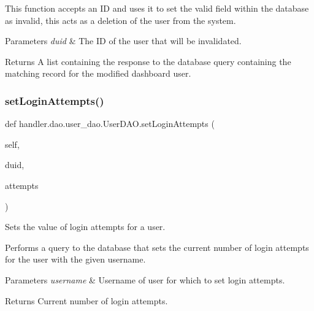 This function accepts an ID and uses it to set the valid field within the database as invalid, this acts as a deletion of the user from the system.


\begin{DoxyParams}{Parameters}
{\em duid} & The ID of the user that will be invalidated.\\
\hline
\end{DoxyParams}
\begin{DoxyReturn}{Returns}
A list containing the response to the database query containing the matching record for the modified dashboard user. 
\end{DoxyReturn}
\mbox{\label{classhandler_1_1dao_1_1user__dao_1_1_user_d_a_o_aec0187ac1e8c477a072a45b040edde2a}} 
\subsubsection{\texorpdfstring{set\+Login\+Attempts()}{setLoginAttempts()}}
{\footnotesize\ttfamily def handler.\+dao.\+user\+\_\+dao.\+User\+D\+A\+O.\+set\+Login\+Attempts (\begin{DoxyParamCaption}\item[{}]{self,  }\item[{}]{duid,  }\item[{}]{attempts }\end{DoxyParamCaption})}



Sets the value of login attempts for a user. 

Performs a query to the database that sets the current number of login attempts for the user with the given username.


\begin{DoxyParams}{Parameters}
{\em username} & Username of user for which to set login attempts.\\
\hline
\end{DoxyParams}
\begin{DoxyReturn}{Returns}
Current number of login attempts. 
\end{DoxyReturn}
\mbox{\label{classhandler_1_1dao_1_1user__dao_1_1_user_d_a_o_a95abcb468f166ca40e8624e926c0f650}} 
